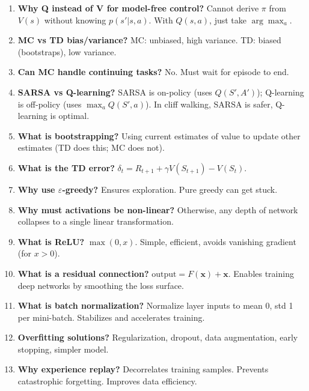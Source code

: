 \documentclass[11pt]{article}
\begin{document}
\begin{enumerate}[leftmargin=*, nosep, itemsep=6pt]

\item \textbf{Why Q instead of V for model-free control?} Cannot derive $\pi$ from $V(s)$ without knowing $p(s'|s,a)$. With $Q(s,a)$, just take $\arg\max_a$.

\item \textbf{MC vs TD bias/variance?} MC: unbiased, high variance. TD: biased (bootstraps), low variance.

\item \textbf{Can MC handle continuing tasks?} No. Must wait for episode to end.

\item \textbf{SARSA vs Q-learning?} SARSA is on-policy (uses $Q(S',A')$); Q-learning is off-policy (uses $\max_a Q(S',a)$). In cliff walking, SARSA is safer, Q-learning is optimal.

\item \textbf{What is bootstrapping?} Using current estimates of value to update other estimates (TD does this; MC does not).

\item \textbf{What is the TD error?} $\delta_t = R_{t+1} + \gamma V(S_{t+1}) - V(S_t)$.

\item \textbf{Why use $\varepsilon$-greedy?} Ensures exploration. Pure greedy can get stuck.

\item \textbf{Why must activations be non-linear?} Otherwise, any depth of network collapses to a single linear transformation.

\item \textbf{What is ReLU?} $\max(0,x)$. Simple, efficient, avoids vanishing gradient (for $x>0$).

\item \textbf{What is a residual connection?} $\text{output} = F(\mathbf{x}) + \mathbf{x}$. Enables training deep networks by smoothing the loss surface.

\item \textbf{What is batch normalization?} Normalize layer inputs to mean 0, std 1 per mini-batch. Stabilizes and accelerates training.

\item \textbf{Overfitting solutions?} Regularization, dropout, data augmentation, early stopping, simpler model.

\item \textbf{Why experience replay?} Decorrelates training samples. Prevents catastrophic forgetting. Improves data efficiency.


\end{enumerate}
\end{document}
